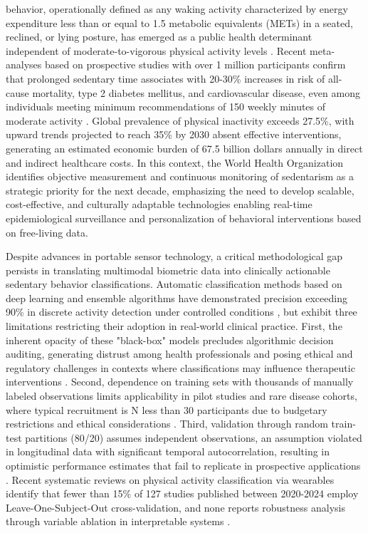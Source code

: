 \documentclass[journal,twoside,web]{ieeecolor}
\begin{document}
 behavior, operationally defined as any waking activity characterized by energy expenditure less than or equal to 1.5 metabolic equivalents (METs) in a seated, reclined, or lying posture, has emerged as a public health determinant independent of moderate-to-vigorous physical activity levels \cite{Bull2020,WHO2020}. Recent meta-analyses based on prospective studies with over 1 million participants confirm that prolonged sedentary time associates with 20-30\% increases in risk of all-cause mortality, type 2 diabetes mellitus, and cardiovascular disease, even among individuals meeting minimum recommendations of 150 weekly minutes of moderate activity \cite{Guthold2020}. Global prevalence of physical inactivity exceeds 27.5\%, with upward trends projected to reach 35\% by 2030 absent effective interventions, generating an estimated economic burden of 67.5 billion dollars annually in direct and indirect healthcare costs. In this context, the World Health Organization identifies objective measurement and continuous monitoring of sedentarism as a strategic priority for the next decade, emphasizing the need to develop scalable, cost-effective, and culturally adaptable technologies enabling real-time epidemiological surveillance and personalization of behavioral interventions based on free-living data.

Despite advances in portable sensor technology, a critical methodological gap persists in translating multimodal biometric data into clinically actionable sedentary behavior classifications. Automatic classification methods based on deep learning and ensemble algorithms have demonstrated precision exceeding 90\% in discrete activity detection under controlled conditions \cite{Khan2024,Chatterjee2024}, but exhibit three limitations restricting their adoption in real-world clinical practice. First, the inherent opacity of these "black-box" models precludes algorithmic decision auditing, generating distrust among health professionals and posing ethical and regulatory challenges in contexts where classifications may influence therapeutic interventions \cite{Escalante2023}. Second, dependence on training sets with thousands of manually labeled observations limits applicability in pilot studies and rare disease cohorts, where typical recruitment is N less than 30 participants due to budgetary restrictions and ethical considerations \cite{Farrahi2024}. Third, validation through random train-test partitions (80/20) assumes independent observations, an assumption violated in longitudinal data with significant temporal autocorrelation, resulting in optimistic performance estimates that fail to replicate in prospective applications \cite{Varoquaux2017,Poldrack2020}. Recent systematic reviews on physical activity classification via wearables identify that fewer than 15\% of 127 studies published between 2020-2024 employ Leave-One-Subject-Out cross-validation, and none reports robustness analysis through variable ablation in interpretable systems \cite{Giurgiu2024}.
\end{document}
